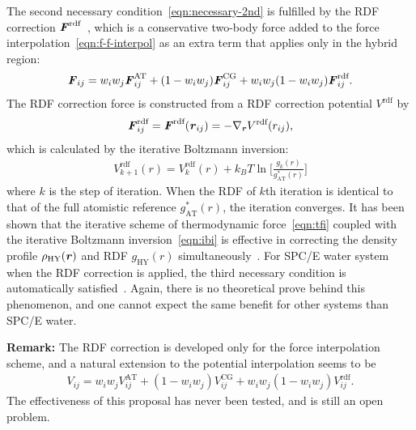 \documentclass[epjST]{svjour}
\newcommand{\vect}[1]{\textbf{\textit{#1}}}
\newcommand{\AT}[0]{\textrm{AT}}
\newcommand{\HY}[0]{\textrm{HY}}
\newcommand{\CG}[0]{\textrm{CG}}
\newcommand{\moleidxone}[0]{i}
\newcommand{\moleidxtwo}[0]{j}
\newcommand{\rdf}{{\textrm{rdf}}}
\begin{document}
The second necessary condition~\eqref{eqn:necessary-2nd} is fulfilled by the
RDF correction $\vect F^\rdf$~\cite{wang2012adaptive}, which is a conservative two-body force added to the force interpolation~\eqref{eqn:f-f-interpol} as an extra term
that applies only in the hybrid region:
\begin{align}\label{eqn:rdf-corr-f}
  {\vect F}_{\moleidxone \moleidxtwo}
  =
  w_\moleidxone w_\moleidxtwo{\vect F}_{\moleidxone\moleidxtwo}^{\AT}
  +
  (1-w_\moleidxone w_\moleidxtwo){\vect F}^{\CG}_{\moleidxone\moleidxtwo}
  +
  w_\moleidxone w_\moleidxtwo(1-w_\moleidxone w_\moleidxtwo){\vect F}^{\rdf}_{\moleidxone\moleidxtwo}.
\end{align}
The RDF correction force is constructed from a RDF correction potential $V^\rdf$ by
\begin{align}
  \vect F_{\moleidxone\moleidxtwo}^\rdf = \vect F^\rdf(\vect r_{\moleidxone\moleidxtwo})
  = -\nabla_{\vect r} V^\rdf(r_{\moleidxone\moleidxtwo}),
\end{align}
which is calculated by the iterative Boltzmann inversion:
\begin{align}\label{eqn:ibi}
  V_{k+1}^\rdf(r) = V_k^\rdf(r) + k_BT \ln \Big[\frac{g_k(r)}{g^\ast_\AT(r)}\Big] 
\end{align}
where $k$ is the step of iteration. When the RDF of $k$th iteration is
identical to that of the full atomistic reference $g^\ast_\AT(r)$, the
iteration converges. It has been shown that the iterative scheme of
thermodynamic force~\eqref{eqn:tfi} coupled with the iterative Boltzmann inversion~\eqref{eqn:ibi}
is effective in correcting the density profile $\rho_\HY(\vect r)$ and
RDF $g_\HY(r)$ simultaneously~\cite{wang2012adaptive}.
For SPC/E water system when the RDF correction is applied, the third
necessary condition is automatically satisfied~\cite{wang2013grand}. Again, there is no
theoretical prove behind this phenomenon, and one cannot expect the same
benefit for other systems than SPC/E water.

\noindent\textbf{Remark:} The RDF correction is developed only for the force interpolation scheme,
and a natural extension to the potential interpolation seems to be
\begin{align}
  {V}_{\moleidxone \moleidxtwo}
  =
  w_\moleidxone w_\moleidxtwo{V}_{\moleidxone\moleidxtwo}^{\AT}
  +
  (1-w_\moleidxone w_\moleidxtwo){V}^{\CG}_{\moleidxone\moleidxtwo}
  +
  w_\moleidxone w_\moleidxtwo(1-w_\moleidxone w_\moleidxtwo){V}^{\rdf}_{\moleidxone\moleidxtwo}.  
\end{align}
The effectiveness of this proposal has never been tested, and is still an open problem.
\end{document}
